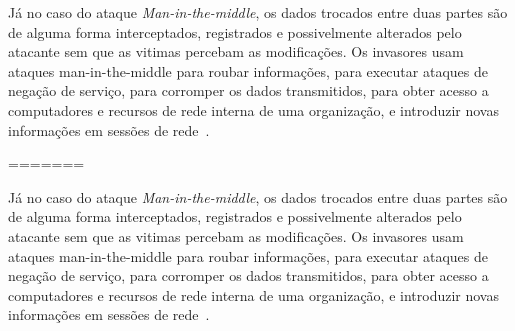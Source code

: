 Já no caso do ataque \emph{Man-in-the-middle}, os dados trocados entre duas partes são de alguma forma interceptados, registrados e possivelmente alterados pelo atacante sem que as vitimas percebam as modificações. Os invasores usam ataques man-in-the-middle para roubar informações, para executar ataques de negação de serviço, para corromper os dados transmitidos, para obter acesso a computadores e recursos de rede interna de uma organização, e introduzir novas informações em sessões de rede~\cite{kim2010fundamentals}.





=======

Já no caso do ataque \emph{Man-in-the-middle}, os dados trocados entre duas partes são de alguma forma interceptados, registrados e possivelmente alterados pelo atacante sem que as vitimas percebam as modificações. Os invasores usam ataques man-in-the-middle para roubar informações, para executar ataques de negação de serviço, para corromper os dados transmitidos, para obter acesso a computadores e recursos de rede interna de uma organização, e introduzir novas informações em sessões de rede~\cite{kim2010fundamentals}.




